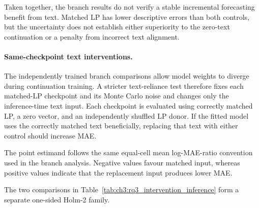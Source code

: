 Taken together, the branch results do not verify a stable incremental
forecasting benefit from text. Matched LP has lower descriptive errors than
both controls, but the uncertainty does not establish either superiority to
the zero-text continuation or a penalty from incorrect text alignment.


\paragraph*{Same-checkpoint text interventions.}

The independently trained branch comparisons allow model weights to diverge
during continuation training.  A stricter text-reliance test therefore fixes
each matched-LP checkpoint and its Monte Carlo noise and changes only the
inference-time text input.  Each checkpoint is evaluated using correctly
matched LP, a zero vector, and an independently shuffled LP donor.  If the
fitted model uses the correctly matched text beneficially, replacing that text
with either control should increase MAE.

The point estimand follows the same equal-cell mean log-MAE-ratio convention
used in the branch analysis.  Negative values favour matched input, whereas
positive values indicate that the replacement input produces lower MAE.


The two comparisons in
Table~\ref{tab:ch3:rq3_intervention_inference} form a separate one-sided
Holm-2 family.

